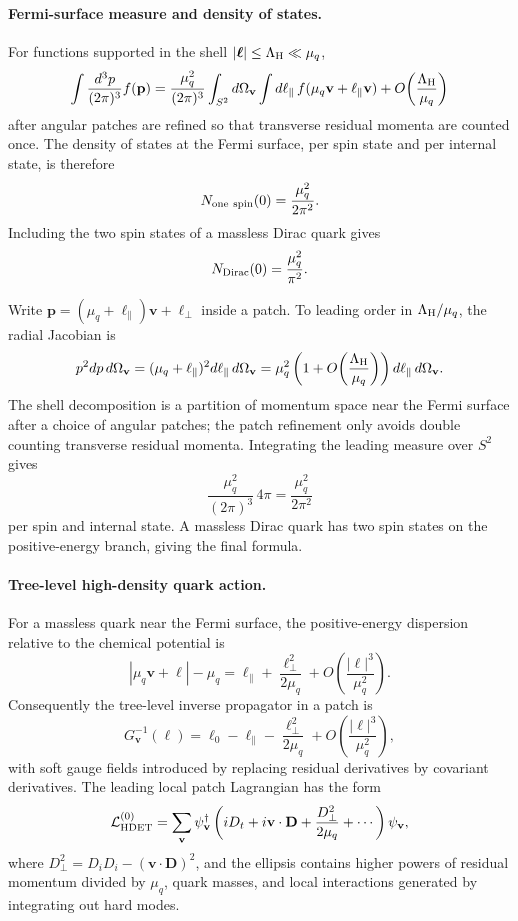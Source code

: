 \paragraph{Fermi-surface measure and density of states.}
For functions supported in the shell
\(|\boldsymbol\ell|\le\Lambda_{\rm H}\ll\mu_q\),
\[
  \int\frac{d^3p}{(2\pi)^3}f(\mathbf p)
  =
  \frac{\mu_q^2}{(2\pi)^3}
  \int_{S^2}d\Omega_{\mathbf v}
  \int d\ell_\parallel\,
  f(\mu_q\mathbf v+\ell_\parallel\mathbf v)
  +O\!\left(\frac{\Lambda_{\rm H}}{\mu_q}\right)
\]
after angular patches are refined so that transverse residual momenta are
counted once.  The density of states at the Fermi surface, per spin state
and per internal state, is therefore
\[
  N_{\rm one\ spin}(0)=\frac{\mu_q^2}{2\pi^2}.
\]
Including the two spin states of a massless Dirac quark gives
\[
  N_{\rm Dirac}(0)=\frac{\mu_q^2}{\pi^2}.
\]

Write \(\mathbf p=(\mu_q+\ell_\parallel)\mathbf v+\boldsymbol\ell_\perp\)
inside a patch.  To leading order in \(\Lambda_{\rm H}/\mu_q\), the radial
Jacobian is
\[
  p^2dp\,d\Omega_{\mathbf v}
  =
  (\mu_q+\ell_\parallel)^2d\ell_\parallel\,d\Omega_{\mathbf v}
  =
  \mu_q^2
  \left(1+O\!\left(\frac{\Lambda_{\rm H}}{\mu_q}\right)\right)
  d\ell_\parallel\,d\Omega_{\mathbf v}.
\]
The shell decomposition is a partition of momentum space near the Fermi
surface after a choice of angular patches; the patch refinement only avoids
double counting transverse residual momenta.  Integrating the leading
measure over \(S^2\) gives
\[
  \frac{\mu_q^2}{(2\pi)^3}\,4\pi
  =
  \frac{\mu_q^2}{2\pi^2}
\]
per spin and internal state.  A massless Dirac quark has two spin states on
the positive-energy branch, giving the final formula.

\paragraph{Tree-level high-density quark action.}
For a massless quark near the Fermi surface, the positive-energy dispersion
relative to the chemical potential is
\[
  |\mu_q\mathbf v+\boldsymbol\ell|-\mu_q
  =
  \ell_\parallel
  +
  \frac{\boldsymbol\ell_\perp^2}{2\mu_q}
  +O\!\left(\frac{|\boldsymbol\ell|^3}{\mu_q^2}\right).
\]
Consequently the tree-level inverse propagator in a patch is
\[
  G_{\mathbf v}^{-1}(\ell)
  =
  \ell_0-\ell_\parallel
  -\frac{\boldsymbol\ell_\perp^2}{2\mu_q}
  +O\!\left(\frac{|\boldsymbol\ell|^3}{\mu_q^2}\right),
\]
with soft gauge fields introduced by replacing residual derivatives by
covariant derivatives.  The leading local patch Lagrangian has the form
\[
  \mathcal L_{\rm HDET}^{(0)}
  =
  \sum_{\mathbf v}
  \psi_{\mathbf v}^{\dagger}
  \left(
    iD_t+i\mathbf v\cdot\mathbf D
    +\frac{D_\perp^2}{2\mu_q}
    +\cdots
  \right)
  \psi_{\mathbf v},
\]
where \(D_\perp^2=D_iD_i-(\mathbf v\cdot\mathbf D)^2\), and the ellipsis
contains higher powers of residual momentum divided by \(\mu_q\), quark
masses, and local interactions generated by integrating out hard modes.

